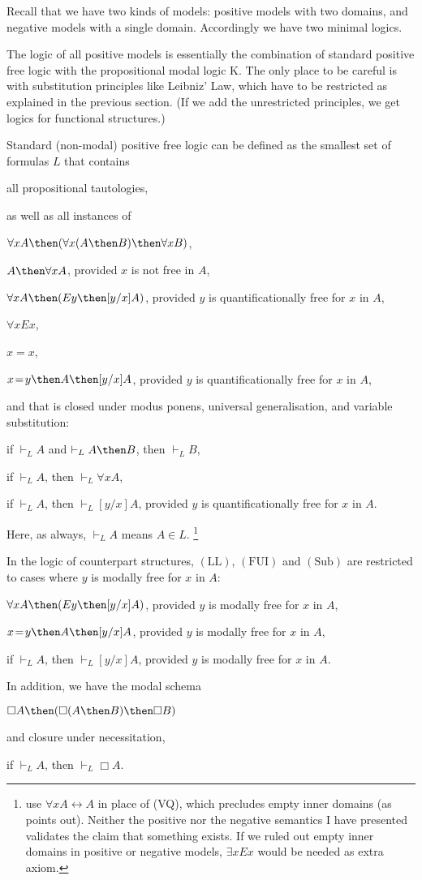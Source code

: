 \documentclass[11pt]{woarticle}
\theoremstyle{break}
\theoremstyle{nonumberplain}
\newcommand{\1}{\;\,|\;\,}
\newcommand{\T}[1]{\ensuremath{(\mathrm{ #1})}}
\newcommand{\itemT}[1]{\item[\T{#1}]}
\begin{document}
Recall that we have two kinds of models: positive models with two domains, and
negative models with a single domain. Accordingly we have two minimal logics.

The logic of all positive models is essentially the combination of standard
positive free logic with the propositional modal logic K. The only place to be
careful is with substitution principles like Leibniz' Law, which have to be
restricted as explained in the previous section. (If we add the unrestricted
principles, we get logics for functional structures.)

Standard (non-modal) positive free logic can be defined as the smallest set of
formulas $L$ that contains
\begin{semantics}
  \itemT{Taut} all propositional tautologies,
\end{semantics}
as well as all instances of
\begin{semantics}
  \itemT{UD} $\forall x A \then (\forall x (A \then B) \then \forall x B)$,
  \itemT{VQ} $A \then \forall x A$, provided $x$ is not free in $A$,
  \itemT{FUI} $\forall x A \then (Ey \then [y/x]A)$, provided $y$ is quantificationally free for $x$ in $A$,
  \itemT{\forall Ex} $\forall x Ex$,
  \itemT{=\!R} $x=x$,
  \itemT{LL} $x\!=\!y \then A \then [y/x]A$, provided $y$ is quantificationally free for $x$ in $A$,
\end{semantics}
and that is closed under modus ponens, universal generalisation, and
variable substitution:
\begin{semantics}
  \itemT{MP} if $\vdash_L A$ and $\vdash_L A \then B$, then $\vdash_L B$,
  \itemT{UG} if $\vdash_L A$, then $\vdash_L \forall x A$,
  \itemT{Sub} if $\vdash_L A$, then $\vdash_L [y/x]A$, provided $y$ is quantificationally free for $x$ in $A$.
\end{semantics}
Here, as always, $\vdash_L A$ means $A \in L$.%
\footnote{%
  \cite{fitting98first} use $\forall x A \leftrightarrow A$ in place of (VQ),
  which precludes empty inner domains (as \cite[38]{kutz00kripke} points out).
  Neither the positive nor the negative semantics I have presented validates the claim
  that something exists. If we ruled out empty inner domains in positive or
  negative models, $\exists x Ex$ would be needed as extra axiom.%
} %

In the logic of counterpart structures, \T{LL}, \T{FUI} and \T{Sub} are
restricted to cases where $y$ is modally free for $x$ in $A$:
\begin{semantics}
  \itemT{FUI^*} $\forall x A \then (Ey \then [y/x]A)$, provided $y$ is modally free for $x$ in $A$,
  \itemT{LL^*} $x\!=\!y \then A \then [y/x]A$, provided $y$ is modally free for $x$ in $A$,
  \itemT{Sub^*} if $\vdash_L A$, then $\vdash_L [y/x]A$, provided $y$ is modally free for $x$ in $A$.
\end{semantics}
In addition, we have the modal schema
\begin{semantics}
  \itemT{K} $\Box A \then (\Box (A \then B) \then \Box B)$
\end{semantics}
and closure under necessitation,
\begin{semantics}
  \itemT{Nec} if $\vdash_L A$, then $\vdash_L \Box A$.
\end{semantics}
\end{document}
